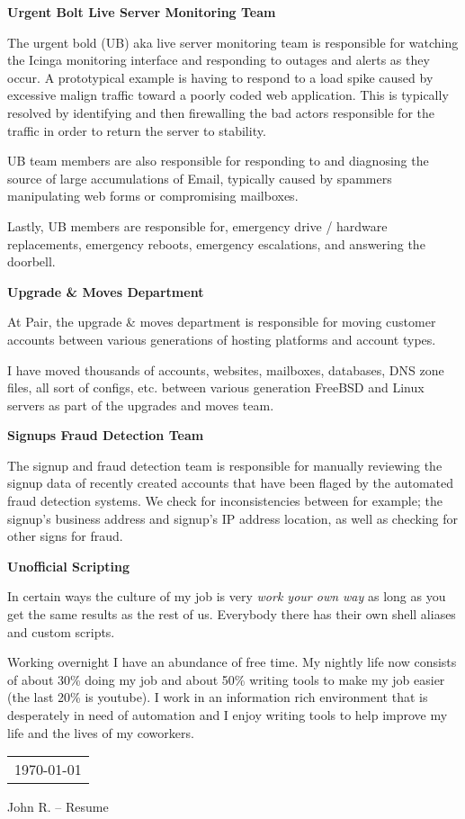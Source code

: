 \documentclass{article}
\begin{document}
\vspace{.25em}
\noindent
\textbf{Urgent Bolt  Live Server Monitoring Team}

The urgent bold (UB) aka live server monitoring team is responsible for
watching the Icinga monitoring interface and responding to outages and alerts
as they occur. A prototypical example is having to respond to a load spike
caused by excessive malign traffic toward a poorly coded web application. This
is typically resolved by identifying and then firewalling the bad actors
responsible for the traffic in order to return the server to stability.

UB team members are also responsible for responding to and diagnosing the
source of large accumulations of Email, typically caused by spammers
manipulating web forms or compromising mailboxes.

Lastly, UB members are responsible for, emergency drive / hardware
replacements, emergency reboots, emergency escalations, and answering the
doorbell.

\vspace{.5em}
\noindent
\textbf{Upgrade \& Moves Department}

At Pair, the upgrade \& moves department is responsible for moving customer
accounts between various generations of hosting platforms and account types.

I have moved thousands of accounts, websites, mailboxes, databases, DNS zone
files, all sort of configs, etc. between various generation FreeBSD and Linux
servers as part of the upgrades and moves team.

\vspace{.5em}
\noindent
\textbf{Signups Fraud Detection Team}

The signup and fraud detection team is responsible for manually reviewing the
signup data of recently created accounts that have been flaged by the automated
fraud detection systems. We check for inconsistencies between for example; the
signup's business address and signup's IP address location, as well as checking
for other signs for fraud.

\vspace{.5em}
\noindent
\textbf{Unofficial Scripting}

In certain ways the culture of my job is very \emph{work your own way} as long
as you get the same results as the rest of us. Everybody there has their own
shell aliases and custom scripts.

Working overnight I have an abundance of free time. My nightly life now
consists of about 30\% doing my job and about 50\% writing tools to make my job
easier (the last 20\% is youtube). I work in an information rich environment
that is desperately in need of automation and I enjoy writing tools to help
improve my life and the lives of my coworkers.

\vfill

\begin{tabular}{r}
\small\today\\
\end{tabular}

\begin{center}
John R. -- Resume 
\end{center}
\end{document}
